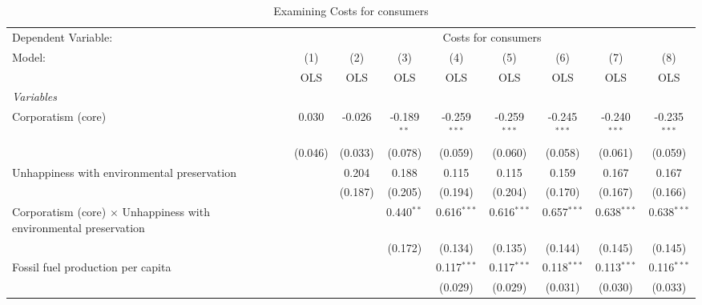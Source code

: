 
\begin{table}[htbp]
   \caption{Examining Costs for consumers}
   \centering
   \begin{tabular}{lcccccccc}
      \toprule
      Dependent Variable: & \multicolumn{8}{c}{Costs for consumers}\\
      Model:                                                                   & (1)     & (2)     & (3)           & (4)            & (5)            & (6)            & (7)            & (8)\\  
                                                                               &  OLS    & OLS     & OLS           & OLS            & OLS            & OLS            & OLS            & OLS\\  
      \midrule
      \emph{Variables}\\
      Corporatism (core)                                                       & 0.030   & -0.026  & -0.189$^{**}$ & -0.259$^{***}$ & -0.259$^{***}$ & -0.245$^{***}$ & -0.240$^{***}$ & -0.235$^{***}$\\   
                                                                               & (0.046) & (0.033) & (0.078)       & (0.059)        & (0.060)        & (0.058)        & (0.061)        & (0.059)\\   
      Unhappiness with environmental preservation                              &         & 0.204   & 0.188         & 0.115          & 0.115          & 0.159          & 0.167          & 0.167\\   
                                                                               &         & (0.187) & (0.205)       & (0.194)        & (0.204)        & (0.170)        & (0.167)        & (0.166)\\   
      Corporatism (core) $\times$ Unhappiness with environmental preservation  &         &         & 0.440$^{**}$  & 0.616$^{***}$  & 0.616$^{***}$  & 0.657$^{***}$  & 0.638$^{***}$  & 0.638$^{***}$\\   
                                                                               &         &         & (0.172)       & (0.134)        & (0.135)        & (0.144)        & (0.145)        & (0.145)\\   
      Fossil fuel production per capita                                        &         &         &               & 0.117$^{***}$  & 0.117$^{***}$  & 0.118$^{***}$  & 0.113$^{***}$  & 0.116$^{***}$\\   
                                                                               &         &         &               & (0.029)        & (0.029)        & (0.031)        & (0.030)        & (0.033)\\   

\end{tabular}
\end{table}
